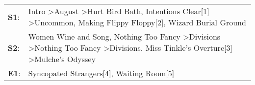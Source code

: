 \begin{supertabular}{p{0.03\textwidth}p{0.92\textwidth}}
 \textbf{S1}:  &                               Intro\textsuperscript{} \textgreater \enspace August\textsuperscript{} \textgreater \enspace Hurt Bird Bath\textsuperscript{}, \enspace Intentions Clear[1]\textsuperscript{} \textgreater \enspace Uncommon\textsuperscript{}, \enspace Making Flippy Floppy[2]\textsuperscript{}, \enspace Wizard Burial Ground\textsuperscript{}  \enspace  \\
 \textbf{S2}:  &  Women Wine and Song\textsuperscript{}, \enspace Nothing Too Fancy\textsuperscript{} \textgreater \enspace Divisions\textsuperscript{} \textgreater \enspace Nothing Too Fancy\textsuperscript{} \textgreater \enspace Divisions\textsuperscript{}, \enspace Miss Tinkle's Overture[3]\textsuperscript{} \textgreater \enspace Mulche's Odyssey\textsuperscript{}  \enspace  \\
 \textbf{E1}:  &                                                                                                                                                                                                                                                                             Syncopated Strangers[4]\textsuperscript{}, \enspace Waiting Room[5]\textsuperscript{}  \enspace  \\
\end{supertabular}
